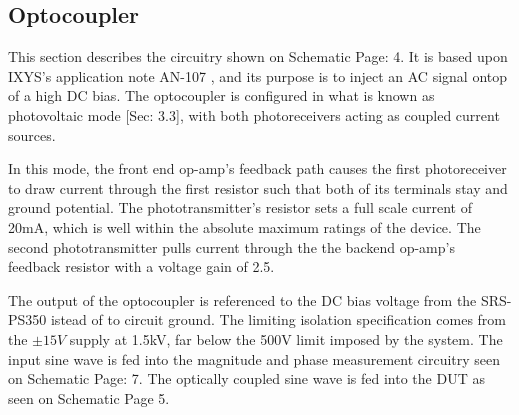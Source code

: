 \subsection{Optocoupler}
\label{sec:opto}

This section describes the circuitry shown on Schematic Page: 4. It is based upon IXYS's application note AN-107 \cite{locAppNote}, and its purpose is to inject an AC signal ontop of a high DC bias. The optocoupler is configured in what is known as photovoltaic mode \cite{locAppNote}[Sec: 3.3], with both photoreceivers acting as coupled current sources.

In this mode, the front end op-amp's feedback path causes the first photoreceiver to draw current through the first resistor such that both of its terminals stay and ground potential. The phototransmitter's resistor sets a full scale current of 20mA, which is well within the absolute maximum ratings of the device. The second phototransmitter pulls current through the the backend op-amp's feedback resistor with a voltage gain of 2.5.

The output of the optocoupler is referenced to the DC bias voltage from the SRS-PS350 istead of to circuit ground. The limiting isolation specification comes from the $\pm 15V$ supply at 1.5kV, far below the 500V limit imposed by the system. The input sine wave is fed into the magnitude and phase measurement circuitry seen on Schematic Page: 7. The optically coupled sine wave is fed into the DUT as seen on Schematic Page 5.

